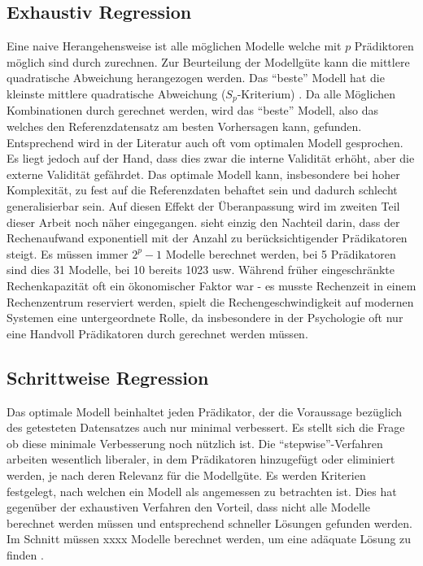 \documentclass[english,12pt,doc]{apa}
\begin{document}
\subsection{Exhaustiv Regression} 
Eine naive Herangehensweise ist alle möglichen Modelle welche mit $p$ Prädiktoren möglich sind durch zurechnen. 
Zur Beurteilung der Modellgüte kann die mittlere quadratische Abweichung herangezogen werden. 
Das ``beste'' Modell hat die kleinste mittlere quadratische Abweichung ($S_p$-Kriterium) \cite[p. 5]{thompson1978selection}. 
Da alle Möglichen Kombinationen durch gerechnet werden, wird das ``beste'' Modell, also das welches den Referenzdatensatz am besten Vorhersagen kann, gefunden. 
Entsprechend wird in der Literatur auch oft vom optimalen Modell gesprochen. Es liegt jedoch auf der Hand, dass dies zwar die interne Validität erhöht, aber die externe Validität gefährdet.
Das optimale Modell kann, insbesondere bei hoher Komplexität, zu fest auf die Referenzdaten behaftet sein und dadurch schlecht generalisierbar sein.
Auf diesen Effekt der Überanpassung wird im zweiten Teil dieser Arbeit noch näher eingegangen.  
 sieht einzig den Nachteil darin, dass der Rechenaufwand exponentiell mit der Anzahl zu berücksichtigender Prädikatoren steigt. 
Es müssen immer $2^p-1$ Modelle berechnet werden, bei 5 Prädikatoren sind dies 31 Modelle, bei 10 bereits 1023 usw.
Während früher eingeschränkte Rechenkapazität oft ein ökonomischer Faktor war - es musste Rechenzeit in einem Rechenzentrum reserviert werden, spielt die Rechengeschwindigkeit auf modernen Systemen eine untergeordnete Rolle, da insbesondere in der Psychologie oft nur eine Handvoll Prädikatoren durch gerechnet werden müssen.

\subsection{Schrittweise Regression} Das optimale Modell beinhaltet jeden Prädikator, der die Voraussage bezüglich des getesteten Datensatzes auch nur minimal verbessert. 
Es stellt sich die Frage ob diese minimale Verbesserung noch nützlich ist. 
Die ``stepwise''-Verfahren arbeiten wesentlich liberaler, in dem Prädikatoren hinzugefügt oder eliminiert werden, je nach deren Relevanz für die Modellgüte. 
Es werden Kriterien festgelegt, nach welchen ein Modell als angemessen zu betrachten ist. 
Dies hat gegenüber der exhaustiven Verfahren den Vorteil, dass nicht alle Modelle berechnet werden müssen und entsprechend schneller Lösungen gefunden werden. 
Im Schnitt müssen xxxx Modelle berechnet werden, um eine adäquate Lösung zu finden \cite{tobecite}.
\end{document}
